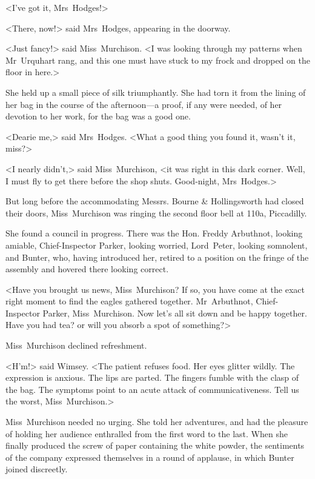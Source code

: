<I've got it, Mrs~Hodges!>

<There, now!> said Mrs~Hodges, appearing in the doorway.

<Just fancy!> said Miss~Murchison. <I was looking through my patterns when Mr~Urquhart rang, and this one must have stuck to my frock and dropped on the floor in here.>

She held up a small piece of silk triumphantly. She had torn it from the lining of her bag in the course of the afternoon—a proof, if any were needed, of her devotion to her work, for the bag was a good one.

<Dearie me,> said Mrs~Hodges. <What a good thing you found it, wasn't it, miss?>

<I nearly didn't,> said Miss~Murchison, <it was right in this dark corner. Well, I must fly to get there before the shop shuts. Good-night, Mrs~Hodges.>

But long before the accommodating Messrs. Bourne \& Hollingsworth had closed their doors, Miss~Murchison was ringing the second floor bell at 110a, Piccadilly.

\divider

She found a council in progress. There was the Hon. Freddy Arbuthnot, looking amiable, Chief-Inspector Parker, looking worried, Lord~Peter, looking somnolent, and Bunter, who, having introduced her, retired to a position on the fringe of the assembly and hovered there looking correct.

<Have you brought us news, Miss~Murchison? If so, you have come at the exact right moment to find the eagles gathered together. Mr~Arbuthnot, Chief-Inspector Parker, Miss~Murchison. Now let's all sit down and be happy together. Have you had tea? or will you absorb a spot of something?>

Miss~Murchison declined refreshment.

<H'm!> said Wimsey. <The patient refuses food. Her eyes glitter wildly. The expression is anxious. The lips are parted. The fingers fumble with the clasp of the bag. The symptoms point to an acute attack of communicativeness. Tell us the worst, Miss~Murchison.>

Miss~Murchison needed no urging. She told her adventures, and had the pleasure of holding her audience enthralled from the first word to the last. When she finally produced the screw of paper containing the white powder, the sentiments of the company expressed themselves in a round of applause, in which Bunter joined discreetly.

